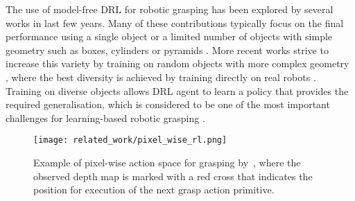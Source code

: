 The use of model-free DRL for robotic grasping has been explored by several works in last few years. Many of these contributions typically focus on the final performance using a single object \cite{popov_data-efficient_2017, haarnoja_composable_2018, zhan_framework_2020} or a limited number of objects with simple geometry such as boxes, cylinders or pyramids \cite{tobin_domain_2017, gualtieri_pick_2018, gualtieri_learning_2018, zeng_learning_2018, liu_active_2019, joshi_robotic_2020, daniel_deep_2020, iqbal_toward_2020}. More recent works strive to increase this variety by training on random objects with more complex geometry \cite{quillen_deep_2018, breyer_comparing_2019, wu_generative_2020, kim_acceleration_2020}, where the best diversity is achieved by training directly on real robots \cite{kalashnikov_qt-opt_2018}. Training on diverse objects allows DRL agent to learn a policy that provides the required generalisation, which is considered to be one of the most important challenges for learning-based robotic grasping \cite{quillen_deep_2018}.

\begin{figure}[b]
    \centering
    \texttt{[image: related\_work/pixel\_wise\_rl.png]}
    \caption{Example of pixel-wise action space for grasping by~\protect\citet{gualtieri_learning_2018}, where the observed depth map is marked with a red cross that indicates the position for execution of the next grasp action primitive.}
    \label{fig:rw_pixel_wise_rl}
\end{figure}

